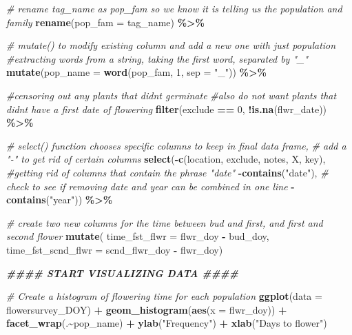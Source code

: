 \documentclass[
]{article}
\newenvironment{Shaded}{\begin{snugshade}}{\end{snugshade}}
\newcommand{\AttributeTok}[1]{\textcolor[rgb]{0.13,0.29,0.53}{#1}}
\newcommand{\CommentTok}[1]{\textcolor[rgb]{0.56,0.35,0.01}{\textit{#1}}}
\newcommand{\DecValTok}[1]{\textcolor[rgb]{0.00,0.00,0.81}{#1}}
\newcommand{\DocumentationTok}[1]{\textcolor[rgb]{0.56,0.35,0.01}{\textbf{\textit{#1}}}}
\newcommand{\FunctionTok}[1]{\textcolor[rgb]{0.13,0.29,0.53}{\textbf{#1}}}
\newcommand{\NormalTok}[1]{#1}
\newcommand{\SpecialCharTok}[1]{\textcolor[rgb]{0.81,0.36,0.00}{\textbf{#1}}}
\newcommand{\StringTok}[1]{\textcolor[rgb]{0.31,0.60,0.02}{#1}}
\begin{document}
\begin{Shaded}
\begin{Highlighting}[]
\CommentTok{\# rename tag\_name as pop\_fam so we know it is telling us the population and family}
  \FunctionTok{rename}\NormalTok{(}\AttributeTok{pop\_fam =}\NormalTok{ tag\_name) }\SpecialCharTok{\%\textgreater{}\%}
  
\CommentTok{\# mutate() to modify existing column and add a new one with just population}
    \CommentTok{\#extracting words from a string, taking the first word, separated by "\_"}
  \FunctionTok{mutate}\NormalTok{(}\AttributeTok{pop\_name =} \FunctionTok{word}\NormalTok{(pop\_fam, }\DecValTok{1}\NormalTok{, }\AttributeTok{sep =} \StringTok{"\_"}\NormalTok{)) }\SpecialCharTok{\%\textgreater{}\%}
 
\CommentTok{\#censoring out any plants that didn\textquotesingle{}t germinate}
  \CommentTok{\#also do not want plants that didn\textquotesingle{}t have a first date of flowering}
  \FunctionTok{filter}\NormalTok{(exclude }\SpecialCharTok{==} \DecValTok{0}\NormalTok{, }\SpecialCharTok{!}\FunctionTok{is.na}\NormalTok{(flwr\_date)) }\SpecialCharTok{\%\textgreater{}\%} 

\CommentTok{\# select() function chooses specific columns to keep in final data frame,}
  \CommentTok{\# add a "{-}" to get rid of certain columns}
   \FunctionTok{select}\NormalTok{(}\SpecialCharTok{{-}}\FunctionTok{c}\NormalTok{(location,}
\NormalTok{             exclude,}
\NormalTok{            notes,}
\NormalTok{            X,}
\NormalTok{            key),}
\CommentTok{\#getting rid of columns that contain the phrase "date"         }
   \SpecialCharTok{{-}}\FunctionTok{contains}\NormalTok{(}\StringTok{"date"}\NormalTok{),}
\CommentTok{\# check to see if removing date and year can be combined in one line}
    \SpecialCharTok{{-}}\FunctionTok{contains}\NormalTok{(}\StringTok{"year"}\NormalTok{)) }\SpecialCharTok{\%\textgreater{}\%}

\CommentTok{\# create two new columns for the time between bud and first, and first and second flower }
  \FunctionTok{mutate}\NormalTok{(}
    \AttributeTok{time\_fst\_flwr =}\NormalTok{ flwr\_doy }\SpecialCharTok{{-}}\NormalTok{ bud\_doy,}
    \AttributeTok{time\_fst\_scnd\_flwr =}\NormalTok{ scnd\_flwr\_doy }\SpecialCharTok{{-}}\NormalTok{ flwr\_doy)}

\DocumentationTok{\#\#\#\# START VISUALIZING DATA \#\#\#\#}

\CommentTok{\# Create a histogram of flowering time for each population}
\FunctionTok{ggplot}\NormalTok{(}\AttributeTok{data =}\NormalTok{ flowersurvey\_DOY) }\SpecialCharTok{+} 
  \FunctionTok{geom\_histogram}\NormalTok{(}\FunctionTok{aes}\NormalTok{(}\AttributeTok{x =}\NormalTok{ flwr\_doy)) }\SpecialCharTok{+}
  \FunctionTok{facet\_wrap}\NormalTok{(.}\SpecialCharTok{\textasciitilde{}}\NormalTok{pop\_name) }\SpecialCharTok{+}
  \FunctionTok{ylab}\NormalTok{(}\StringTok{"Frequency"}\NormalTok{) }\SpecialCharTok{+}
  \FunctionTok{xlab}\NormalTok{(}\StringTok{"Days to flower"}\NormalTok{)}
\end{Highlighting}
\end{Shaded}
\end{document}
